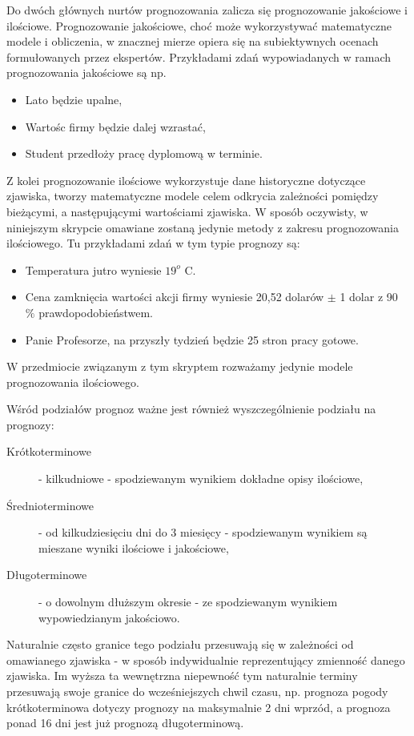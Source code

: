 \documentclass[10pt,a4paper]{book}
\begin{document}
Do dwóch głównych nurtów prognozowania zalicza się \citep[Ch. 1]{montgomery2015introduction} prognozowanie jakościowe i ilościowe. Prognozowanie jakościowe, choć może wykorzystywać matematyczne modele i obliczenia, w znacznej mierze opiera się na subiektywnych ocenach formułowanych przez ekspertów. Przykładami zdań wypowiadanych w ramach prognozowania jakościowe są np.
\begin{itemize}
\item Lato będzie upalne,
\item Wartośc firmy będzie dalej wzrastać,
\item Student przedłoży pracę dyplomową w terminie.
\end{itemize}
Z kolei prognozowanie ilościowe wykorzystuje dane historyczne dotyczące zjawiska, tworzy matematyczne modele celem odkrycia zależności pomiędzy bieżącymi, a następującymi wartościami zjawiska. W sposób oczywisty, w niniejszym skrypcie omawiane zostaną jedynie metody z zakresu prognozowania ilościowego. Tu przykładami zdań w tym typie prognozy są:
\begin{itemize}
\item Temperatura jutro wyniesie $19^o$ C.
\item Cena zamknięcia wartości akcji firmy wyniesie 20,52 dolarów $\pm$ 1
dolar z 90 $\%$ prawdopodobieństwem.
\item Panie Profesorze, na przyszły tydzień będzie 25 stron pracy gotowe.
\end{itemize}
W przedmiocie związanym z tym skryptem rozważamy jedynie modele prognozowania ilościowego.

Wśród podziałów prognoz ważne jest również wyszczególnienie podziału na prognozy:
\begin{description}
\item[Krótkoterminowe] - kilkudniowe - spodziewanym wynikiem dokładne opisy ilościowe,
\item[Średnioterminowe] - od kilkudziesięciu dni do 3 miesięcy - spodziewanym wynikiem są mieszane wyniki ilościowe i jakościowe, 
\item[Długoterminowe] - o dowolnym dłuższym okresie - ze spodziewanym wynikiem wypowiedzianym jakościowo. 
\end{description}
Naturalnie często granice tego podziału przesuwają się w zależności od omawianego zjawiska - w sposób indywidualnie reprezentujący zmienność danego zjawiska. Im wyższa ta wewnętrzna niepewność tym naturalnie terminy przesuwają swoje granice do wcześniejszych chwil czasu, np. prognoza pogody krótkoterminowa dotyczy prognozy na maksymalnie 2 dni wprzód, a prognoza ponad 16 dni jest już prognozą długoterminową.
\end{document}
